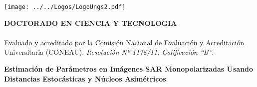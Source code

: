 \newpage
\vspace{-3cm}
\begin{flushright}
	\texttt{[image: ../../Logos/LogoUngs2.pdf]}
\end{flushright}

	\begin{center}
		\textbf{DOCTORADO EN CIENCIA Y TECNOLOGIA}\vspace{-3mm}\\
		\hrulefill\\
		{\small Evaluado y acreditado por la Comisión Nacional de Evaluación y Acreditación Universitaria (CONEAU). \emph{Resolución Nº 1178/11. Calificación “B”}.}
	\end{center}
	
	\vspace{1cm}
	
	\noindent\makebox[\linewidth]{\rule{15 cm}{1.5pt}}
	\begin{center}
		\textbf{{\LARGE Estimación de Parámetros en Imágenes SAR Monopolarizadas Usando Distancias Estocásticas y Núcleos Asimétricos}}
	\end{center}
	\noindent\makebox[\linewidth]{\rule{15 cm}{1.5pt}}
	
